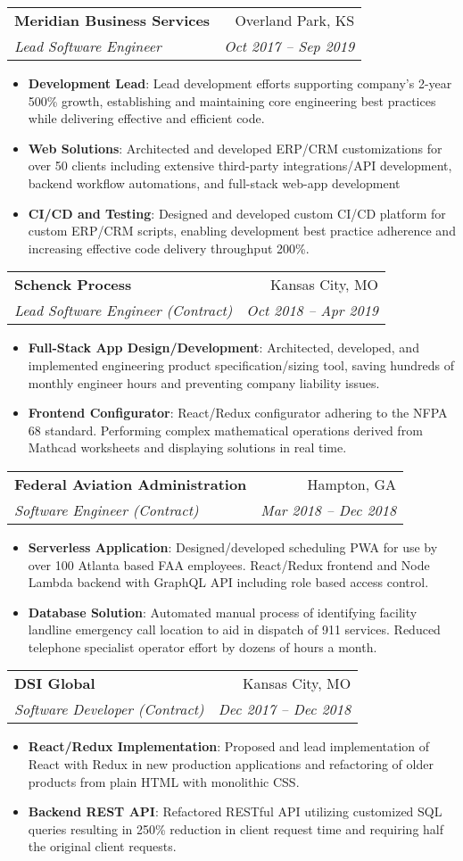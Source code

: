 \documentclass[letterpaper,11pt]{article}
\makeatletter
\newcommand{\resumeItem}[2]{
  \item\small{
    \textbf{#1}{: #2 \vspace{-2pt}}
  }
}
\newcommand{\resumeSubheading}[4]{
  \vspace{-4pt}\item
    \begin{tabular*}{0.97\textwidth}[t]{l@{\extracolsep{\fill}}r}
      \textbf{#1} & #2 \\
      \textit{\small#3} & \textit{\small #4} \\
    \end{tabular*}\vspace{-5pt}
}
\newcommand{\resumeItemListStart}{\begin{itemize}[leftmargin=0.15in]}
\newcommand{\resumeItemListEnd}{\end{itemize}\vspace{-5pt}}
\makeatother
\begin{document}
    \resumeSubheading
      {Meridian Business Services}{Overland Park, KS}
      {Lead Software Engineer}{Oct 2017 -- Sep 2019}
      \resumeItemListStart
        \resumeItem{Development Lead}
          {Lead development efforts supporting company's 2-year 500\% growth, 
          establishing and maintaining core engineering best practices while delivering effective and efficient code.}
        \resumeItem{Web Solutions}
          {Architected and developed ERP/CRM customizations for over 50 clients including extensive 
          third-party integrations/API development, backend workflow automations, and full-stack web-app development}
        \resumeItem{CI/CD and Testing}
          {Designed and developed custom CI/CD platform for custom ERP/CRM scripts, enabling development best practice 
          adherence and increasing effective code delivery throughput 200\%.}
      \resumeItemListEnd

    \resumeSubheading
      {Schenck Process}{Kansas City, MO}
      {Lead Software Engineer (Contract)}{Oct 2018 -- Apr 2019}
      \resumeItemListStart
        \resumeItem{Full-Stack App Design/Development}
          {Architected, developed, and implemented engineering product specification/sizing tool, saving hundreds of 
          monthly engineer hours and preventing company liability issues.}
        \resumeItem{Frontend Configurator}
          {React/Redux configurator adhering to the NFPA 68 standard. Performing complex mathematical operations derived from Mathcad worksheets 
          and displaying solutions in real time.}

      \resumeItemListEnd
    \resumeSubheading
      {Federal Aviation Administration}{Hampton, GA}
      {Software Engineer (Contract)}{Mar 2018 -- Dec 2018}
      \resumeItemListStart
        \resumeItem{Serverless Application}
          {Designed/developed scheduling PWA for use by over 100 Atlanta based FAA employees. 
          React/Redux frontend and Node Lambda backend with GraphQL API including role based access control.}
        \resumeItem{Database Solution}
          {Automated manual process of identifying facility landline emergency call location to aid in dispatch of 911 services. 
          Reduced telephone specialist operator effort by dozens of hours a month.}
      \resumeItemListEnd

    \resumeSubheading
      {DSI Global}{Kansas City, MO}
      {Software Developer (Contract)}{Dec 2017 -- Dec 2018}
      \resumeItemListStart
        \resumeItem{React/Redux Implementation}
          {Proposed and lead implementation of React with Redux in new production applications 
          and refactoring of older products from plain HTML with monolithic CSS.}
        \resumeItem{Backend REST API}
          {Refactored RESTful API utilizing customized SQL queries resulting in 250\% reduction in client request time and requiring half the original client requests.}
      \resumeItemListEnd
\end{document}
